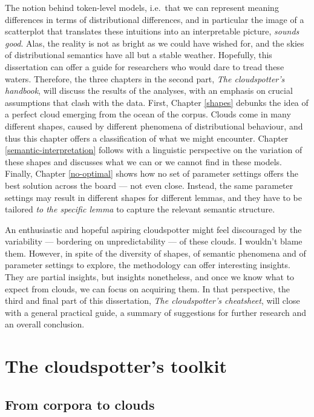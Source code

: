 \documentclass[
]{book}
\begin{document}
The notion behind token-level models, i.e.~that we can represent meaning differences in terms of distributional differences, and in particular the image of a scatterplot that translates these intuitions into an interpretable picture, \emph{sounds good}.
Alas, the reality is not as bright as we could have wished for, and the skies of distributional semantics have all but a stable weather. Hopefully, this dissertation can offer a guide for researchers who would dare to tread these waters. Therefore, the three chapters in the second part, \emph{The cloudspotter's handbook}, will discuss the results of the analyses, with an emphasis on crucial assumptions that clash with the data. First, Chapter \ref{shapes} debunks the idea of a perfect cloud emerging from the ocean of the corpus. Clouds come in many different shapes, caused by different phenomena of distributional behaviour, and thus this chapter offers a classification of what we might encounter. Chapter \ref{semantic-interpretation} follows with a linguistic perspective on the variation of these shapes and discusses what we can or we cannot find in these models. Finally, Chapter \ref{no-optimal} shows how no set of parameter settings offers the best solution across the board --- not even close. Instead, the same parameter settings may result in different shapes for different lemmas, and they have to be tailored \emph{to the specific lemma} to capture the relevant semantic structure.

An enthusiastic and hopeful aspiring cloudspotter might feel discouraged by the variability --- bordering on unpredictability --- of these clouds. I wouldn't blame them. However, in spite of the diversity of shapes, of semantic phenomena and of parameter settings to explore, the methodology can offer interesting insights. They are partial insights, but insights nonetheless, and once we know what to expect from clouds, we can focus on acquiring them. In that perspective, the third and final part of this dissertation, \emph{The cloudspotter's cheatsheet}, will close with a general practical guide, a summary of suggestions for further research and an overall conclusion.

\hypertarget{part-the-cloudspotters-toolkit}{%
\part{The cloudspotter's toolkit}\label{part-the-cloudspotters-toolkit}}

\hypertarget{workflow}{%
\chapter{From corpora to clouds}\label{workflow}}
\end{document}
